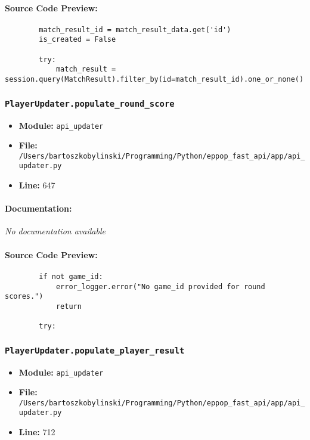 \documentclass[11pt,a4paper]{article}
\begin{document}
\paragraph{Source Code Preview:}
\begin{verbatim}
        match_result_id = match_result_data.get('id')
        is_created = False

        try:
            match_result = session.query(MatchResult).filter_by(id=match_result_id).one_or_none()
\end{verbatim}

\vspace{1em}
\subsubsection{\texttt{PlayerUpdater.populate\_round\_score}}

\begin{itemize}
    \item \textbf{Module:} \texttt{api\_updater}
    \item \textbf{File:} \texttt{/Users/bartoszkobylinski/Programming/Python/eppop\_fast\_api/app/api\_updater.py}
    \item \textbf{Line:} 647
\end{itemize}

\paragraph{Documentation:} \textit{No documentation available}

\paragraph{Source Code Preview:}
\begin{verbatim}
        if not game_id:
            error_logger.error("No game_id provided for round scores.")
            return

        try:
\end{verbatim}

\vspace{1em}
\subsubsection{\texttt{PlayerUpdater.populate\_player\_result}}

\begin{itemize}
    \item \textbf{Module:} \texttt{api\_updater}
    \item \textbf{File:} \texttt{/Users/bartoszkobylinski/Programming/Python/eppop\_fast\_api/app/api\_updater.py}
    \item \textbf{Line:} 712
\end{itemize}
\end{document}
